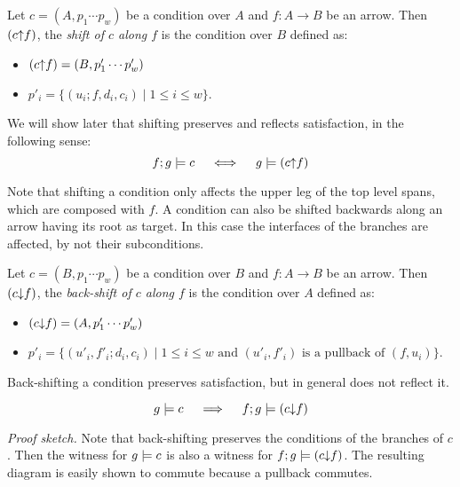 \begin{definition}
    Let $c = (A,p_1\cdots p_w)$ be a condition over $A$ and $f: A \to B$ be an arrow. Then $(c{\uparrow} f)$, the \emph{shift of $c$ along $f$} is the condition over $B$ defined as:
    \begin{itemize}
        \item $(c{\uparrow} f) = (B, p'_1\cdots p'_w)$
        \item $p'_i = \{(u_i;f,d_i,c_i) \mid 1\leq i\leq w\}$.
     \end{itemize}
\end{definition}
We will show later that shifting preserves and reflects satisfaction, in the following sense: 
\begin{equation}
    \label{eq:shiftPresReflSat}
    f;g \models c \quad \iff\quad  g \models (c{\uparrow} f)
\end{equation} 

Note that shifting a condition only affects the upper leg of the top level spans, which are composed with $f$. A condition can also be shifted backwards along an arrow having its root as target. In this case the interfaces of the branches are affected, by not their subconditions.  

\begin{definition}
    Let $c = (B,p_1\cdots p_w)$ be a condition over $B$ and $f: A \to B$ be an arrow. Then $(c{\downarrow} f)$, the \emph{back-shift of $c$ along $f$} is the condition over $A$ defined as:
    \begin{itemize}
        \item $(c{\downarrow} f) = (A, p'_1\cdots p'_w)$
        \item $p'_i = \{(u'_i,f'_i;d_i,c_i) \mid 1\leq i\leq w \mbox{ and } (u'_i,f'_i) \mbox{ is a pullback of } (f,u_i)\}$.
     \end{itemize}
\end{definition}

Back-shifting a condition preserves satisfaction, but in general does not reflect it.

\begin{proposition}
\begin{equation}
    g \models c \quad \implies \quad f;g \models (c{\downarrow} f)
\end{equation}    
\end{proposition} 
\emph{Proof sketch.} Note that back-shifting preserves the conditions of the branches of $c$. Then the witness for $g \models c$ is also a witness for $f;g \models (c{\downarrow} f)$. The resulting diagram is easily shown to commute because a pullback commutes.

